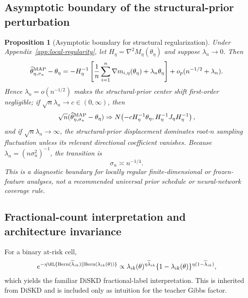 \documentclass{article} %
\newtheorem{proposition}{Proposition}
\begin{document}
\subsection{Asymptotic boundary of the structural-prior perturbation}
\begin{proposition}[Asymptotic boundary for structural regularization]
\label{prop:prior-scale-regime}
Under Appendix~\ref{app:local-regularity}, let $H_\eta=\nabla^2M_\eta(\theta_\eta)$ and suppose $\lambda_n\to0$. Then
\begin{equation}
\widehat\theta_{\eta,\sigma_n}^{\rm MAP}-\theta_\eta
=
-H_\eta^{-1}\left[
\frac1n\sum_{i=1}^n\nabla m_{i,\eta}(\theta_\eta)
+\lambda_n\theta_\eta
\right]+o_p(n^{-1/2}+\lambda_n).
\label{eq:prior-scale-expansion}
\end{equation}
Hence $\lambda_n=o(n^{-1/2})$ makes the structural-prior center shift first-order negligible; if $\sqrt n\lambda_n\to c\in(0,\infty)$, then
\begin{equation}
\sqrt n(\widehat\theta_{\eta,\sigma_n}^{\rm MAP}-\theta_\eta)
\Rightarrow
N\!\left(-cH_\eta^{-1}\theta_\eta, H_\eta^{-1}J_\eta H_\eta^{-1}\right),
\label{eq:prior-boundary-limit}
\end{equation}
and if $\sqrt n\lambda_n\to\infty$, the structural-prior displacement dominates root-$n$ sampling fluctuation unless its relevant directional coefficient vanishes. Because $\lambda_n=(n\sigma_n^2)^{-1}$, the transition is
\begin{equation}
\sigma_n\asymp n^{-1/4}.
\label{eq:sigma-quarter-rate}
\end{equation}
This is a diagnostic boundary for locally regular finite-dimensional or frozen-feature analyses, not a recommended universal prior schedule or neural-network coverage rule.
\end{proposition}



\subsection{Fractional-count interpretation and architecture invariance}
For a binary at-risk cell,
\begin{equation}
e^{-\eta\KL\{\mathrm{Bern}(\widetilde\lambda_{ik})\Vert\mathrm{Bern}(\lambda_{ik}(\theta))\}}
\propto
\lambda_{ik}(\theta)^{\eta\widetilde\lambda_{ik}}
\{1-\lambda_{ik}(\theta)\}^{\eta(1-\widetilde\lambda_{ik})},
\label{eq:pseudocountkernel}
\end{equation}
which yields the familiar DiSKD fractional-label interpretation. This is inherited from DiSKD and is included only as intuition for the teacher Gibbs factor.
\end{document}

